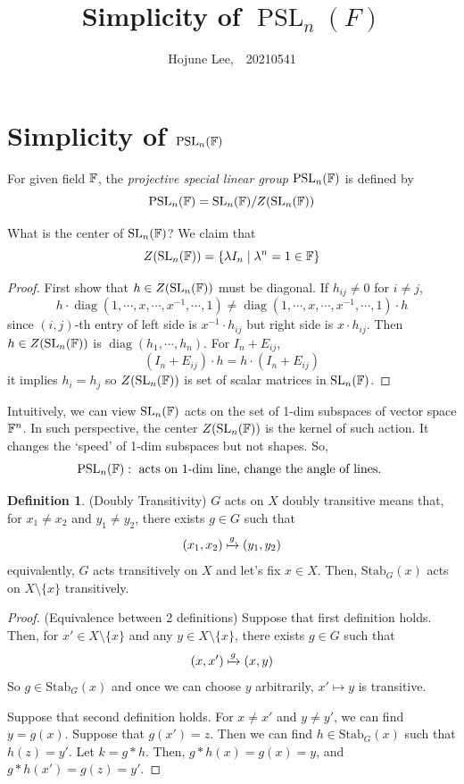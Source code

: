 \documentclass[12pt, letterpaper]{amsart}
\author[Hojune Lee]{Hojune Lee,\ \ 20210541}
\title{Simplicity of $\operatorname{PSL}_n(F)$}
\theoremstyle{definition}
\newtheorem{defn}[thm]{Definition}
\theoremstyle{remark}
\newcommand{\PSL}{{\mathrm{PSL}}}
\newcommand{\Stab}{\mathrm{Stab}}
\theoremstyle{plain}
\numberwithin{equation}{section}
\begin{document}
\maketitle

\section{Simplicity of $\PSL_n(\BF)$}

For given field ${\mathbb {F}}$, the \textit{projective special linear group} $\operatorname{PSL}_n({\mathbb {F}})$ is defined by 
\[\operatorname{PSL}_n({\mathbb {F}}) = \operatorname{SL}_n({\mathbb {F}})/Z(\operatorname{SL}_n({\mathbb {F}}))\]

What is the center of ${\mathrm{SL}}_n({\mathbb {F}})$? We claim that 
\[Z({\mathrm{SL}}_n({\mathbb {F}})) = \{\lambda I_n \mid \lambda^n = 1 \in {\mathbb {F}}\}\]
\begin{proof}
    First show that $h \in Z({\mathrm{SL}}_n({\mathbb {F}}))$ must be diagonal. If $h_{ij} \neq 0$ for $i \neq j$, 
    \[h \cdot \operatorname{diag}(1, \cdots, x, \cdots, x^{-1}, \cdots, 1) \neq \operatorname{diag}(1, \cdots, x, \cdots, x^{-1}, \cdots, 1) \cdot h\]
    since $(i,j)$-th entry of left side is $x^{-1}\cdot h_{ij}$ but right side is $x \cdot h_{ij}$. 
    Then $h \in Z({\mathrm{SL}}_n({\mathbb {F}}))$ is $\operatorname{diag}(h_1, \cdots, h_n)$. 
    For $I_n + E_{ij}$, 
    \[(I_n + E_{ij}) \cdot h = h \cdot (I_n + E_{ij})\]
    it implies $h_i = h_j$ so $Z({\mathrm{SL}}_n({\mathbb {F}}))$ is set of scalar matrices in ${\mathrm{SL}}_n({\mathbb {F}})$. 
\end{proof}

Intuitively, we can view ${\mathrm{SL}}_n({\mathbb {F}})$ acts on the set of 1-dim subspaces of vector space ${\mathbb {F}}^n$. 
In such perspective, the center $Z({\mathrm{SL}}_n({\mathbb {F}}))$ is the kernel of such action. 
It changes the \lq speed' of 1-dim subspaces but not shapes. So, 
\[\PSL_n(\BF): \text{ acts on 1-dim line, change the angle of lines. }\]

\hrulefill

\begin{defn}
    (Doubly Transitivity) $G$ acts on $X$ doubly transitive means that, 
    for $x_1 \neq x_2$ and $y_1 \neq y_2$, there exists $g \in G$ such that 
    \[(x_1, x_2) \xmapsto{g} (y_1, y_2)\]
    equivalently, $G$ acts transitively on $X$ and let's fix $x \in X$. Then, $\Stab_G(x)$ acts on $X \setminus \{x\}$ transitively. 
\end{defn}

\hrulefill

\begin{proof}
    (Equivalence between 2 definitions) Suppose that first definition holds. 
    Then, for $x' \in X \setminus \{x\}$ and any $y \in X \setminus \{x\}$, there exists $g \in G$ such that 
    \[(x, x') \xmapsto{g} (x, y)\]
    So $g \in \Stab_G(x)$ and once we can choose $y$ arbitrarily, $x' \mapsto y$ is transitive. 

    Suppose that second definition holds. 
    For $x \neq x'$ and $y \neq y'$, we can find $y = g(x)$. 
    Suppose that $g(x') = z$. Then we can find $h \in \Stab_G(x)$ such that 
    $h(z) = y'$. Let $k = g * h$. Then, $g * h(x) = g(x) = y$, and $g * h(x') = g(z) = y'$. 
\end{proof}
\end{document}
